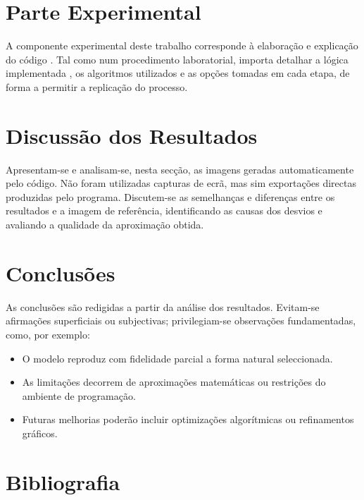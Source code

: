 \documentclass[12pt,a4paper,oneside]{extarticle}
\begin{document}
\section{Parte Experimental}
A componente experimental deste trabalho corresponde à elaboração e explicação do código \cite{carvalho2021praticas}.  
Tal como num procedimento laboratorial, importa detalhar a lógica implementada \cite{martins2015programacao}, os algoritmos utilizados e as opções tomadas em cada etapa, de forma a permitir a replicação do processo.

\section{Discussão dos Resultados}
Apresentam-se e analisam-se, nesta secção, as imagens geradas automaticamente pelo código.  
Não foram utilizadas capturas de ecrã, mas sim exportações directas produzidas pelo programa.  
Discutem-se as semelhanças e diferenças entre os resultados e a imagem de referência, identificando as causas dos desvios e avaliando a qualidade da aproximação obtida.

\section{Conclusões}
As conclusões são redigidas a partir da análise dos resultados.  
Evitam-se afirmações superficiais ou subjectivas; privilegiam-se observações fundamentadas, como, por exemplo:  
\begin{itemize}
    \item O modelo reproduz com fidelidade parcial a forma natural seleccionada.
    \item As limitações decorrem de aproximações matemáticas ou restrições do ambiente de programação.
    \item Futuras melhorias poderão incluir optimizações algorítmicas ou refinamentos gráficos.
\end{itemize}

\section{Bibliografia}
\printbibliography

\label{fim}
\end{document}
